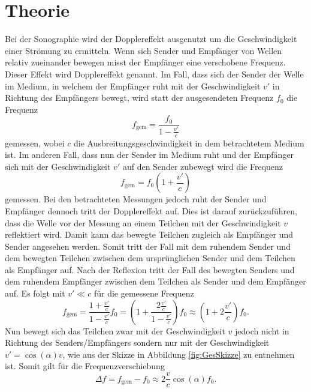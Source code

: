
\section{Theorie}
\label{sec:Theorie}

Bei der Sonographie wird der Dopplereffekt ausgenutzt um die Geschwindigkeit einer Strömung zu ermitteln.
Wenn sich Sender und Empfänger von Wellen relativ zueinander bewegen misst der Empfänger eine verschobene Frequenz. Dieser Effekt wird Dopplereffekt genannt. Im Fall, dass sich der Sender der Welle im Medium, in welchem der Empfänger ruht mit der Geschwindigkeit $v'$ in Richtung des Empfängers bewegt, wird statt der ausgesendeten Frequenz $f_0$ die Frequenz
\begin{equation}
	f_\text{gem}=\frac{f_0}{1-\frac{v'}{c}}
\end{equation}
gemessen, wobei $c$ die Ausbreitungsgeschwindigkeit in dem betrachtetem Medium ist. Im anderen Fall, dass nun der Sender im Medium ruht und der Empfänger sich mit der Geschwindigkeit $v'$ auf den Sender zubewegt wird die Frequenz
\begin{equation}
	f_\text{gem}=f_0(1+\frac{v'}{c})
\end{equation}
gemessen. Bei den betrachteten Messungen jedoch ruht der Sender und Empfänger dennoch tritt der Dopplereffekt auf. Dies ist darauf zurückzuführen, dass die Welle vor der Messung an einem Teilchen mit der Geschwindigkeit $v$ reflektiert wird. Damit kann das bewegte Teilchen zugleich als Empfänger und Sender angesehen werden. Somit tritt der Fall mit dem ruhendem Sender und dem bewegten Teilchen zwischen dem ursprünglichen Sender und dem Teilchen als Empfänger auf. Nach der Reflexion tritt der Fall des bewegten Senders und dem ruhendem Empfänger zwischen dem Teilchen als Sender und dem Empfänger auf. Es folgt mit $v' \ll c$ für die gemessene Frequenz
\begin{equation}
	f_\text{gem}=\frac{1+\frac{v'}{c}}{1-\frac{v'}{c}} f_0=\left(1+\frac{2\frac{v'}{c}}{1-\frac{v'}{c}}\right) f_0\approx \left(1+2\frac{v'}{c}\right) f_0 \text{.}
\end{equation}
Nun bewegt sich das Teilchen zwar mit der Geschwindigkeit $v$ jedoch nicht in Richtung des Senders/Empfängers sondern nur mit der Geschwindigkeit $v'= \cos(\alpha) v$, wie aus der Skizze in Abbildung \ref{fig:GesSkizze} zu entnehmen ist. Somit gilt für die Frequenzverschiebung
\begin{equation}
	\Delta f = f_\text{gem}-f_0 \approx 2 \frac{v}{c} \cos(\alpha) f_0 \text{.}\label{eq:deltaf}
\end{equation}
